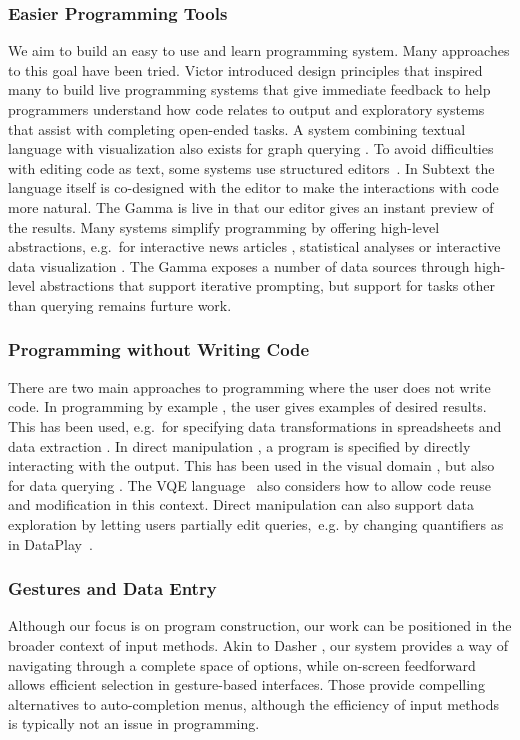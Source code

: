 \documentclass[manuscript,review,anonymous]{acmart}
\begin{document}
\subsubsection*{Easier Programming Tools}
We aim to build an easy to use and learn programming system. Many approaches to this
goal have been tried. Victor \cite{principle} introduced design principles that
inspired many to build live programming systems \cite{review,liveroad,lighttable} that give
immediate feedback to help programmers understand how code relates to output and
exploratory systems \cite{variolite,exploratory} that assist with completing open-ended tasks.
A system combining textual language with visualization also exists for graph querying \cite{guess}.
To avoid difficulties with editing code as text, some systems use structured editors~\cite{structure-based,livenut,lamdu}.
In Subtext \cite{subtext,directprog} the language itself is co-designed with the editor to make
the interactions with code more natural. The Gamma is live in that our editor gives an instant
preview of the results.
%
Many systems simplify programming by offering high-level abstractions,
e.g.~for interactive news articles \cite{idyll}, statistical analyses \cite{tea}
or interactive data visualization \cite{interactionviz,vegalite}. The Gamma exposes a number
of data sources through high-level abstractions that support iterative prompting, but support
for tasks other than querying remains furture work.

\subsubsection*{Programming without Writing Code}
There are two main approaches to programming where
the user does not write code. In programming by example \cite{byexample}, the user gives
examples of desired results. This has been used, e.g.~for specifying data transformations
in spreadsheets and data extraction \cite{spreadsheetpbe,flashextract}.
In direct manipulation \cite{direct}, a program is specified by directly interacting with the
output. This has been used in the visual domain \cite{sketchnsketch}, but also for data querying
\cite{dynamicq,vlang}. The VQE language~\cite{visage} also considers how to allow code reuse and
modification in this context. Direct manipulation can also support data exploration by letting
users partially edit queries,~e.g. by changing quantifiers as in DataPlay~\cite{dataplay}.

\subsubsection*{Gestures and Data Entry}
Although our focus is on program construction, our work can be positioned in the
broader context of input methods. Akin to Dasher \cite{dasher}, our system provides a way of
navigating through a complete space of options, while on-screen feedforward \cite{octopocus} allows
efficient selection in gesture-based interfaces. Those provide compelling alternatives to
auto-completion menus, although the efficiency of input methods is typically not an issue in programming.
\end{document}
